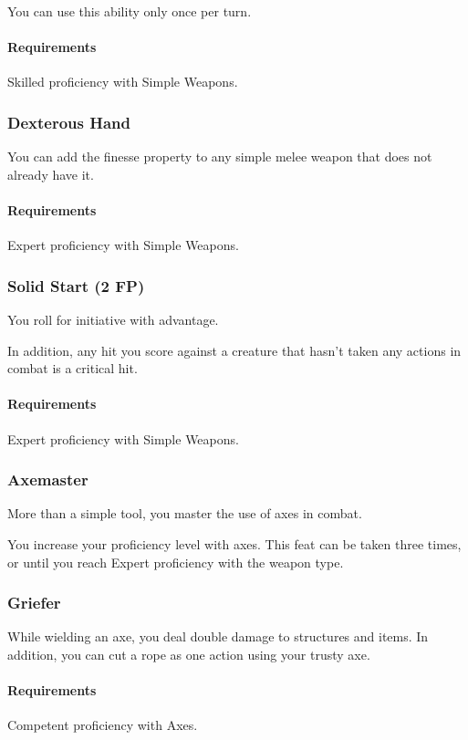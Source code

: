     You can use this ability only once per turn.
    \paragraph{Requirements} Skilled proficiency with Simple Weapons.
\subsubsection{Dexterous Hand} \label{feat::dexteroushand}
    You can add the finesse property to any simple melee weapon that does not already have it.
    \paragraph{Requirements} Expert proficiency with Simple Weapons.
\subsubsection{Solid Start (2 FP)} \label{feat::solidstart}
    You roll for initiative with advantage.

    In addition, any hit you score against a creature that hasn't taken any actions in combat is a critical hit.
    \paragraph{Requirements} Expert proficiency with Simple Weapons.

\subsubsection{Axemaster} \label{feat::axemaster}
    More than a simple tool, you master the use of axes in combat.

    You increase your proficiency level with axes.
    This feat can be taken three times, or until you reach Expert proficiency with the weapon type.
\subsubsection{Griefer} \label{feat::griefer}
    While wielding an axe, you deal double damage to structures and items.
    In addition, you can cut a rope as one action using your trusty axe.
    \paragraph{Requirements} Competent proficiency with Axes.
